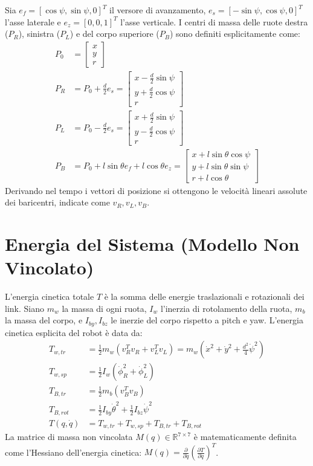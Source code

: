 \documentclass[11pt,a4paper]{article}
\begin{document}
Sia $e_f = [\cos\psi, \sin\psi, 0]^T$ il versore di avanzamento, $e_s = [-\sin\psi, \cos\psi, 0]^T$ l'asse laterale e $e_z = [0, 0, 1]^T$ l'asse verticale. I centri di massa delle ruote destra ($P_R$), sinistra ($P_L$) e del corpo superiore ($P_B$) sono definiti esplicitamente come:
\begin{align}
    P_0 &= \begin{bmatrix} x \\ y \\ r \end{bmatrix} \\
    P_R &= P_0 + \frac{d}{2} e_s = \begin{bmatrix} x - \frac{d}{2}\sin\psi \\ y + \frac{d}{2}\cos\psi \\ r \end{bmatrix} \\
    P_L &= P_0 - \frac{d}{2} e_s = \begin{bmatrix} x + \frac{d}{2}\sin\psi \\ y - \frac{d}{2}\cos\psi \\ r \end{bmatrix} \\
    P_B &= P_0 + l \sin\theta e_f + l \cos\theta e_z = \begin{bmatrix} x + l \sin\theta \cos\psi \\ y + l \sin\theta \sin\psi \\ r + l \cos\theta \end{bmatrix}
\end{align}
Derivando nel tempo i vettori di posizione si ottengono le velocità lineari assolute dei baricentri, indicate come $v_R, v_L, v_B$.

\section{Energia del Sistema (Modello Non Vincolato)}

L'energia cinetica totale $T$ è la somma delle energie traslazionali e rotazionali dei link. Siano $m_w$ la massa di ogni ruota, $I_w$ l'inerzia di rotolamento della ruota, $m_b$ la massa del corpo, e $I_{by}, I_{bz}$ le inerzie del corpo rispetto a pitch e yaw.
L'energia cinetica esplicita del robot è data da:
\begin{align}
    T_{w,tr} &= \frac{1}{2}m_w (v_R^T v_R + v_L^T v_L) = m_w \left( \dot{x}^2 + \dot{y}^2 + \frac{d^2}{4}\dot{\psi}^2 \right) \\
    T_{w,sp} &= \frac{1}{2}I_w (\dot{\phi}_R^2 + \dot{\phi}_L^2) \\
    T_{B,tr} &= \frac{1}{2}m_b (v_B^T v_B) \\
    T_{B,rot} &= \frac{1}{2}I_{by} \dot{\theta}^2 + \frac{1}{2}I_{bz} \dot{\psi}^2 \\
    T(q, \dot{q}) &= T_{w,tr} + T_{w,sp} + T_{B,tr} + T_{B,rot}
\end{align}
La matrice di massa non vincolata $M(q) \in \mathbb{R}^{7 \times 7}$ è matematicamente definita come l'Hessiano dell'energia cinetica: $M(q) = \frac{\partial}{\partial \dot{q}} \left( \frac{\partial T}{\partial \dot{q}} \right)^T$.
\end{document}
